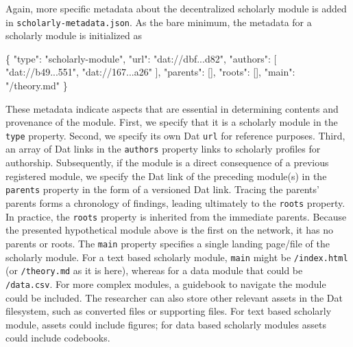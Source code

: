 \documentclass[publications,article,submit,moreauthors,pdftex,10pt,a4paper]{Definitions/mdpi}
\newenvironment{Shaded}{\begin{snugshade}}{\end{snugshade}}
\newcommand{\DataTypeTok}[1]{\textcolor[rgb]{0.13,0.29,0.53}{#1}}
\newcommand{\FunctionTok}[1]{\textcolor[rgb]{0.00,0.00,0.00}{#1}}
\newcommand{\OtherTok}[1]{\textcolor[rgb]{0.56,0.35,0.01}{#1}}
\newcommand{\StringTok}[1]{\textcolor[rgb]{0.31,0.60,0.02}{#1}}
\begin{document}
Again, more specific metadata about the decentralized scholarly module
is added in \texttt{scholarly-metadata.json}. As the bare minimum, the
metadata for a scholarly module is initialized as

\begin{Shaded}
\begin{Highlighting}[]
\FunctionTok{\{}
  \DataTypeTok{"type"}\FunctionTok{:} \StringTok{"scholarly-module"}\FunctionTok{,}
  \DataTypeTok{"url"}\FunctionTok{:} \StringTok{"dat://dbf...d82"}\FunctionTok{,}
  \DataTypeTok{"authors"}\FunctionTok{:} \OtherTok{[}
    \StringTok{"dat://b49...551"}\OtherTok{,}
    \StringTok{"dat://167...a26"}
  \OtherTok{]}\FunctionTok{,}
  \DataTypeTok{"parents"}\FunctionTok{:} \OtherTok{[]}\FunctionTok{,}
  \DataTypeTok{"roots"}\FunctionTok{:} \OtherTok{[]}\FunctionTok{,}
  \DataTypeTok{"main"}\FunctionTok{:} \StringTok{"/theory.md"}
\FunctionTok{\}}
\end{Highlighting}
\end{Shaded}


These metadata indicate aspects that are essential in determining
contents and provenance of the module. First, we specify that it is a
scholarly module in the \texttt{type} property. Second, we specify its
own Dat \texttt{url} for reference purposes. Third, an array of Dat
links in the \texttt{authors} property links to scholarly profiles for
authorship. Subsequently, if the module is a direct consequence of a
previous registered module, we specify the Dat link of the preceding
module(s) in the \texttt{parents} property in the form of a versioned
Dat link. Tracing the parents' parents forms a chronology of findings,
leading ultimately to the \texttt{roots} property. In practice, the
\texttt{roots} property is inherited from the immediate parents. Because
the presented hypothetical module above is the first on the network, it
has no parents or roots. The \texttt{main} property specifies a single
landing page/file of the scholarly module. For a text based scholarly
module, \texttt{main} might be \texttt{/index.html} (or
\texttt{/theory.md} as it is here), whereas for a data module that could
be \texttt{/data.csv}. For more complex modules, a guidebook to navigate
the module could be included. The researcher can also store other
relevant assets in the Dat filesystem, such as converted files or
supporting files. For text based scholarly module, assets could include
figures; for data based scholarly modules assets could include
codebooks.
\end{document}
